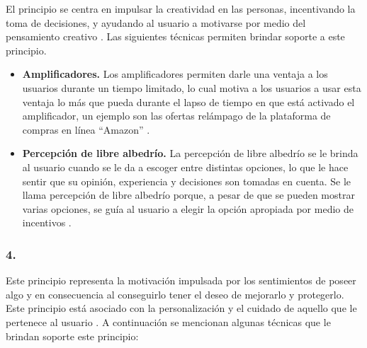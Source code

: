  El principio se centra en impulsar la creatividad en las personas, incentivando la
 toma de decisiones, y ayudando al usuario a motivarse por medio del pensamiento
 creativo \cite[p. 126]{Octalysis}. Las siguientes técnicas permiten brindar soporte
 a este principio.

    \begin{itemize}
    \item
    {\bf Amplificadores.}
        Los amplificadores permiten darle una ventaja a los usuarios durante un tiempo limitado,
        lo cual motiva a los usuarios a usar esta ventaja lo más que pueda durante el lapso de tiempo
        en que está activado el amplificador, un ejemplo son las ofertas relámpago de la plataforma
        de compras en línea ``Amazon'' \cite[p. 146]{Octalysis}.

    \item
    {\bf Percepción de libre albedrío.}
        La percepción de libre albedrío se le brinda al usuario cuando se le da a
        escoger entre distintas opciones, lo que le hace sentir que su opinión,
        experiencia y decisiones son tomadas en cuenta. Se le llama percepción
        de libre albedrío porque, a pesar de que se pueden mostrar varias opciones,
        se guía al usuario a elegir la opción apropiada por medio de incentivos
        \cite[p. 150]{Octalysis}.
    \end{itemize}

\subsubsection{4. \principioIV} \label{subsec:principioIV}

 Este principio representa la motivación impulsada por los sentimientos de
 poseer algo y en consecuencia al conseguirlo tener el deseo de mejorarlo y
 protegerlo. Este principio está asociado con la personalización y el cuidado de
 aquello que le pertenece al usuario \cite[p. 161]{Octalysis}. A continuación se
 mencionan algunas técnicas que le brindan soporte este principio:

